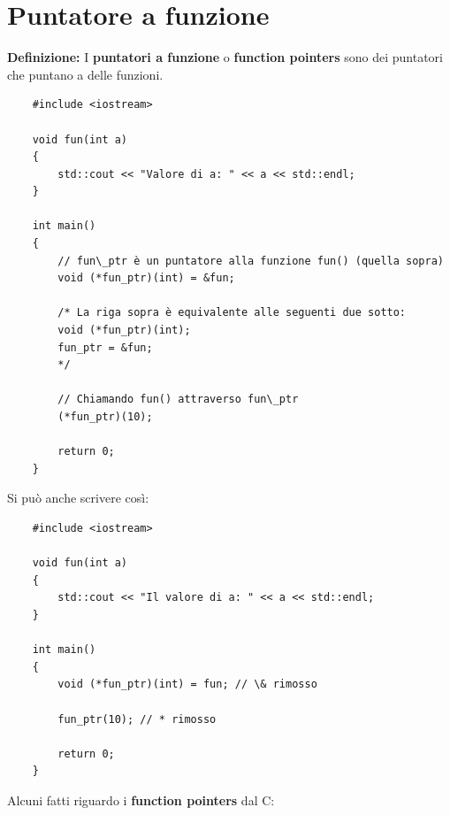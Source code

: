 

\newpage

\section{Puntatore a funzione}

\textsf{\small \textbf{Definizione: } I \textbf{puntatori a funzione} o \textbf{function pointers} sono dei puntatori che puntano a delle funzioni.} \\ %

\begin{lstlisting}
	#include <iostream>
	
	void fun(int a)
	{
		std::cout << "Valore di a: " << a << std::endl;
	}
	
	int main()
	{
		// fun\_ptr è un puntatore alla funzione fun() (quella sopra)
		void (*fun_ptr)(int) = &fun;
		
		/* La riga sopra è equivalente alle seguenti due sotto:
		void (*fun_ptr)(int);
		fun_ptr = &fun;
		*/
		
		// Chiamando fun() attraverso fun\_ptr
		(*fun_ptr)(10);
		
		return 0;
	}
\end{lstlisting}

\textsf{\small Si può anche scrivere così: } \\

\begin{lstlisting}
	#include <iostream>
	
	void fun(int a)
	{
		std::cout << "Il valore di a: " << a << std::endl;
	}
	
	int main()
	{
		void (*fun_ptr)(int) = fun; // \& rimosso
		
		fun_ptr(10); // * rimosso
		
		return 0;
	}
\end{lstlisting}

\textsf{\small Alcuni fatti riguardo i \textbf{function pointers} dal C: } \\


